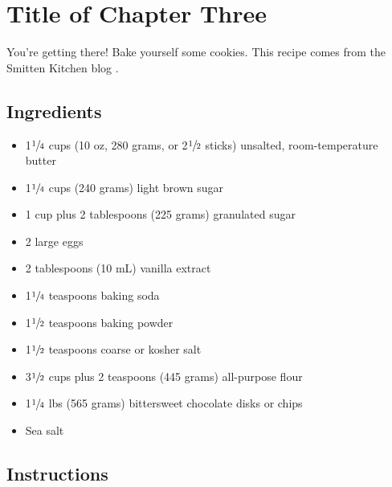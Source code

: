 \chapter{Title of Chapter Three}

You're getting there! Bake yourself some cookies. This recipe comes from the Smitten Kitchen blog \cite{cookierecipe}.

\section{Ingredients}

\begin{itemize}
    \item 1$\sfrac{1}{4}$ cups (10 oz, 280 grams, or 2$\sfrac{1}{2}$ sticks) unsalted, room-temperature butter
    \item 1$\sfrac{1}{4}$ cups (240 grams) light brown sugar
    \item 1 cup plus 2 tablespoons (225 grams) granulated sugar
    \item 2 large eggs
    \item 2 tablespoons (10 mL) vanilla extract
    \item 1$\sfrac{1}{4}$ teaspoons baking soda
    \item 1$\sfrac{1}{2}$ teaspoons baking powder
    \item 1$\sfrac{1}{2}$ teaspoons coarse or kosher salt
    \item 3$\sfrac{1}{2}$ cups plus 2 teaspoons (445 grams) all-purpose flour
    \item 1$\sfrac{1}{4}$ lbs (565 grams) bittersweet chocolate disks or chips
    \item Sea salt
\end{itemize}

\section{Instructions}

